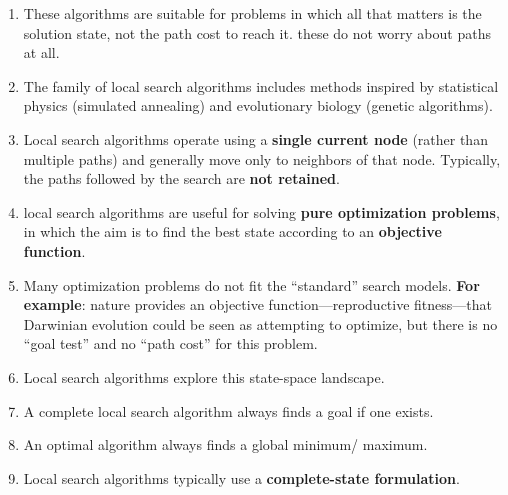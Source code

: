 \begin{enumerate}
    \item These algorithms are suitable for problems in which all that matters is the solution state, not the path cost to reach it.
    these do not worry about paths at all.
    \hfill \cite{ai/book/Artificial-Intelligence-A-Modern-Approach/Russell-Norvig}

    \item The family of local search algorithms includes methods inspired by statistical physics (simulated annealing) and evolutionary biology (genetic algorithms).
    \hfill \cite{ai/book/Artificial-Intelligence-A-Modern-Approach/Russell-Norvig}

    \item Local search algorithms operate using a \textbf{single current node} (rather than multiple paths) and generally move only to neighbors of that node.
    Typically, the paths followed by the search are \textbf{not retained}.
    \hfill \cite{ai/book/Artificial-Intelligence-A-Modern-Approach/Russell-Norvig}

    \item local search algorithms are useful for solving \textbf{pure optimization problems}, in which the aim is to find the best state according to an \textbf{objective function}.
    \hfill \cite{ai/book/Artificial-Intelligence-A-Modern-Approach/Russell-Norvig}

    \item Many optimization problems do not fit the “standard” search models.
    \textbf{For example}: nature provides an objective function—reproductive fitness—that Darwinian evolution could be seen as attempting to optimize, but there is no “goal test” and no “path cost” for this problem.
    \hfill \cite{ai/book/Artificial-Intelligence-A-Modern-Approach/Russell-Norvig}

    \item  Local search algorithms explore this state-space landscape.
    \hfill \cite{ai/book/Artificial-Intelligence-A-Modern-Approach/Russell-Norvig}

    \item A complete local search algorithm always finds a goal if one exists.
    \hfill \cite{ai/book/Artificial-Intelligence-A-Modern-Approach/Russell-Norvig}

    \item An optimal algorithm always finds a global minimum/ maximum.
    \hfill \cite{ai/book/Artificial-Intelligence-A-Modern-Approach/Russell-Norvig}

    \item Local search algorithms typically use a \textbf{complete-state formulation}.
    \hfill  \cite{ai/book/Artificial-Intelligence-A-Modern-Approach/Russell-Norvig}


\end{enumerate}
